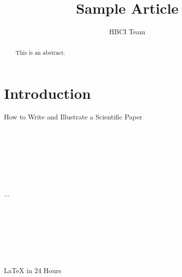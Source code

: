 \documentclass[acmlarge]{acmart}
\begin{document}
\title{Sample Article}
\author{HBCI Team}
\begin{abstract}This is an abstract.\end{abstract}
\maketitle
\section{Introduction}
How to Write and Illustrate a Scientific Paper
\cite{gustaviiHowWriteIllustrate2017a}
\\\\\\\\\\\\\\\\...\\\\\\\\\\\\\\\\
LaTeX in 24 Hours \cite{dattaLaTeX24Hours2017}


\end{document}
